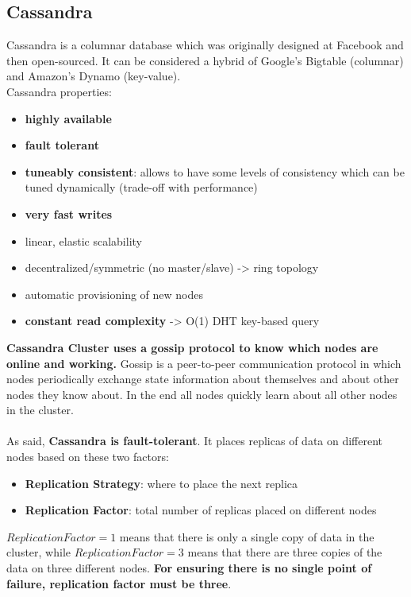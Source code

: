 \documentclass[10pt,a4paper]{article}
\newcommand{\nline}{\\~\\}
\begin{document}
\subsection{Cassandra}
Cassandra is a columnar database which was originally designed at Facebook and then open-sourced. It can be considered a hybrid of Google’s Bigtable (columnar) and Amazon’s Dynamo (key-value). \\
Cassandra properties:
\begin{itemize}
	\item \textbf{highly available}
	\item \textbf{fault tolerant}
	\item \textbf{tuneably consistent}: allows to have some levels of consistency which can be tuned dynamically (trade-off with performance)
	\item \textbf{very fast writes}
	\item linear, elastic scalability
	\item decentralized/symmetric (no master/slave) -> ring topology
	\item automatic provisioning of new nodes 
	\item \textbf{constant read complexity} -> O(1) DHT key-based query
\end{itemize}
\textbf{Cassandra Cluster uses a gossip protocol to know which nodes are online and working.} Gossip is a peer-to-peer communication protocol in which nodes periodically exchange state information about themselves and about other nodes they know about. In the end all nodes quickly learn about all other nodes in the cluster.
\nline
As said, \textbf{Cassandra is fault-tolerant}. It places replicas of data on different nodes based on these two factors:
\begin{itemize}
	\item \textbf{Replication Strategy}: where to place the next replica
	\item \textbf{Replication Factor}: total number of replicas placed on different nodes
\end{itemize}
$ReplicationFactor = 1$ means that there is only a single copy of data in the cluster, while $ReplicationFactor = 3$ means that there are three copies of the data on three different nodes. \textbf{For ensuring there is no single point of failure, replication factor must be three}. 
\end{document}
